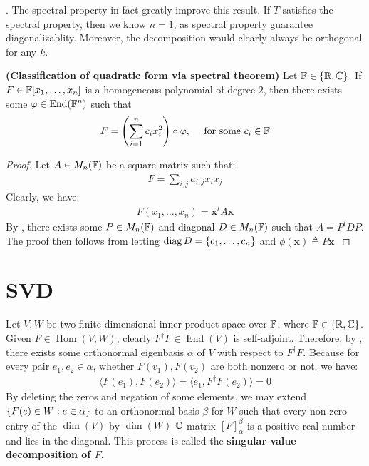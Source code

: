 \documentclass{report}
\begin{document}
. The spectral property in fact greatly improve this result. If $T$ satisfies the spectral property, then we know  $n=1$, as spectral property guarantee  diagonalizablity. Moreover, the decomposition would clearly always be orthogonal for any $k$.    
\begin{theorem}
\textbf{(Classification of quadratic form via spectral theorem)} Let $\mathbb{F} \in \left\{ \mathbb{R}, \mathbb{C} \right\}$. If $F \in \mathbb{F}[x_1,\dots ,x_n]$ is a homogeneous polynomial of degree $2$, then there exists some  $\varphi \in \operatorname{End}(\mathbb{F}^n)$ such that 
\begin{align*}
F = \left(\sum_{i=1}^n c_ix_i^2\right) \circ \varphi,\quad \text{ for some }c_i \in \mathbb{F}
\end{align*}
\end{theorem}
\begin{proof}
Let $A \in M_n(\mathbb{F})$ be a square matrix such that: 
\begin{align*}
F= \sum_{i,j} a_{i,j}x_ix_j
\end{align*}
Clearly, we have: 
\begin{align*}
F(x_1,\dots ,x_n)= \textbf{x}^t A  \textbf{x}
\end{align*}
By , there exists some $P \in M_n(\mathbb{F})$ and diagonal $D \in M_n(\mathbb{F})$ such that  $A=P^t D P$. The proof then follows from letting $\operatorname{diag}D= \left\{ c_1,\dots ,c_n \right\}$ and $\phi (\textbf{x})\triangleq P \textbf{x}$. 
\end{proof}
\section{SVD}
\label{SVD}
Let $V,W$ be two finite-dimensional inner product space over $\mathbb{F}$, where $\mathbb{F}\in \left\{ \mathbb{R},\mathbb{C} \right\}$. Given $F\in \operatorname{Hom}(V,W)$, clearly $F^{\dagger }F\in \operatorname{End}(V)$ is self-adjoint. Therefore, by , there exists some orthonormal eigenbasis $\alpha  $ of $V$ with respect to $F^{\dagger }F$. Because for every pair $e_1,e_2 \in \alpha  $, whether $F(v_1),F(v_2)$ are both nonzero or not, we have: 
\begin{align*}
\langle F(e_1),F(e_2)\rangle  = \langle e_1, F^{\dagger } F(e_2)\rangle = 0
\end{align*}
By deleting the zeros and negation of some elements, we may extend $\left\{ F(e)\in W: e \in \alpha   \right\}$ to an orthonormal basis $\beta$ for $W$ such that every non-zero entry of the $\operatorname{dim}(V)$-by-$\operatorname{dim}(W)$ $\mathbb{C}$-matrix $[F]_{\alpha }^\beta $  is a positive real number and lies in the diagonal. This process is called the \textbf{singular value decomposition of $F$}. \\
\end{document}
